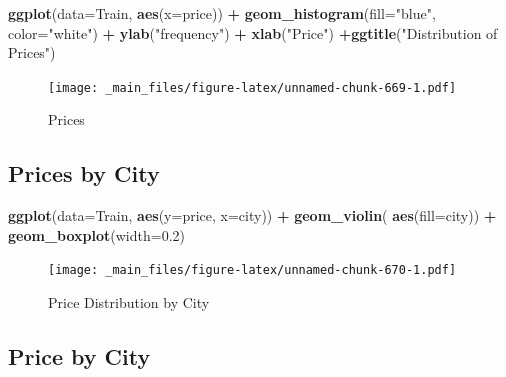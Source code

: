 \documentclass[]{book}
\newenvironment{Shaded}{\begin{snugshade}}{\end{snugshade}}
\newcommand{\KeywordTok}[1]{\textcolor[rgb]{0.13,0.29,0.53}{\textbf{#1}}}
\newcommand{\DataTypeTok}[1]{\textcolor[rgb]{0.13,0.29,0.53}{#1}}
\newcommand{\FloatTok}[1]{\textcolor[rgb]{0.00,0.00,0.81}{#1}}
\newcommand{\StringTok}[1]{\textcolor[rgb]{0.31,0.60,0.02}{#1}}
\newcommand{\OperatorTok}[1]{\textcolor[rgb]{0.81,0.36,0.00}{\textbf{#1}}}
\newcommand{\NormalTok}[1]{#1}
\begin{document}
\begin{Shaded}
\begin{Highlighting}[]
\KeywordTok{ggplot}\NormalTok{(}\DataTypeTok{data=}\NormalTok{Train, }\KeywordTok{aes}\NormalTok{(}\DataTypeTok{x=}\NormalTok{price)) }\OperatorTok{+}\StringTok{ }\KeywordTok{geom_histogram}\NormalTok{(}\DataTypeTok{fill=}\StringTok{"blue"}\NormalTok{, }\DataTypeTok{color=}\StringTok{"white"}\NormalTok{) }\OperatorTok{+}\StringTok{ }
\StringTok{  }\KeywordTok{ylab}\NormalTok{(}\StringTok{"frequency"}\NormalTok{) }\OperatorTok{+}\StringTok{ }\KeywordTok{xlab}\NormalTok{(}\StringTok{"Price"}\NormalTok{) }\OperatorTok{+}\KeywordTok{ggtitle}\NormalTok{(}\StringTok{"Distribution of Prices"}\NormalTok{)}
\end{Highlighting}
\end{Shaded}

\begin{figure}
\centering
\texttt{[image: \_main\_files/figure-latex/unnamed-chunk-669-1.pdf]}
\caption{\label{fig:unnamed-chunk-669}Prices}
\end{figure}

\subsection{Prices by City}\label{prices-by-city}

\begin{Shaded}
\begin{Highlighting}[]
\KeywordTok{ggplot}\NormalTok{(}\DataTypeTok{data=}\NormalTok{Train, }\KeywordTok{aes}\NormalTok{(}\DataTypeTok{y=}\NormalTok{price, }\DataTypeTok{x=}\NormalTok{city)) }\OperatorTok{+}\StringTok{ }\KeywordTok{geom_violin}\NormalTok{( }\KeywordTok{aes}\NormalTok{(}\DataTypeTok{fill=}\NormalTok{city)) }\OperatorTok{+}\StringTok{ }\KeywordTok{geom_boxplot}\NormalTok{(}\DataTypeTok{width=}\FloatTok{0.2}\NormalTok{)}
\end{Highlighting}
\end{Shaded}

\begin{figure}
\centering
\texttt{[image: \_main\_files/figure-latex/unnamed-chunk-670-1.pdf]}
\caption{\label{fig:unnamed-chunk-670}Price Distribution by City}
\end{figure}

\subsection{Price by City}\label{price-by-city}
\end{document}
